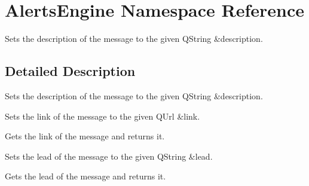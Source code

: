 \hypertarget{namespaceAlertsEngine}{}\section{Alerts\+Engine Namespace Reference}
\label{namespaceAlertsEngine}


Sets the description of the message to the given Q\+String \&description.  




\subsection{Detailed Description}
Sets the description of the message to the given Q\+String \&description. 

Sets the link of the message to the given Q\+Url \&link.

Gets the link of the message and returns it.

Sets the lead of the message to the given Q\+String \&lead.

Gets the lead of the message and returns it. 